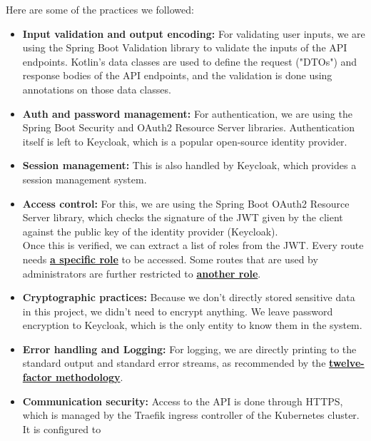 \documentclass[12pt,x11names]{article}
\begin{document}
\medskip
Here are some of the practices we followed:

\begin{itemize}
  \item \textbf{Input validation and output encoding:} For validating user inputs, we
  are using the Spring Boot Validation library to validate the inputs of the API
  endpoints. Kotlin's data classes are used to define the request ("DTOs") and response 
  bodies of the API endpoints, and the validation is done using annotations on those 
  data classes.
  \item \textbf{Auth and password management:} For authentication, we are using the Spring
  Boot Security and OAuth2 Resource Server libraries. Authentication itself is left to Keycloak,
  which is a popular open-source identity provider.
  \item \textbf{Session management:} This is also handled by Keycloak, which provides
  a session management system.
  \item \textbf{Access control:} For this, we are using the Spring Boot OAuth2 Resource
  Server library, which checks the signature of the JWT given by the client against the
  public key of the identity provider (Keycloak).
  \medskip \\
  Once this is verified, we can extract a list of roles from the JWT. Every route needs
  \href{https://github.com/thomas-mauran/LinkedOut/blob/04707ea2f0a31d8f8977ee31a2e7603779aae71f/backend/api_gateway/src/main/kotlin/com/linkedout/backend/config/SecurityConfig.kt#L24}{\textbf{a specific role}} 
  to be accessed. Some routes that are used by administrators are further restricted to
  \href{https://github.com/thomas-mauran/LinkedOut/blob/04707ea2f0a31d8f8977ee31a2e7603779aae71f/backend/api_gateway/src/main/kotlin/com/linkedout/backend/controller/ProfileController.kt#L59}{\textbf{another role}}.
  \item \textbf{Cryptographic practices:} Because we don't directly stored sensitive data in
  this project, we didn't need to encrypt anything. We leave password encryption to Keycloak,
  which is the only entity to know them in the system.
  \item \textbf{Error handling and Logging:} For logging, we are directly printing to the
  standard output and standard error streams, as recommended by the \href{https://12factor.net/logs}{\textbf{twelve-factor methodology}}.
  \item \textbf{Communication security:} Access to the API is done through HTTPS, which is
  managed by the Traefik ingress controller of the Kubernetes cluster. It is configured to

\end{itemize}
\end{document}
